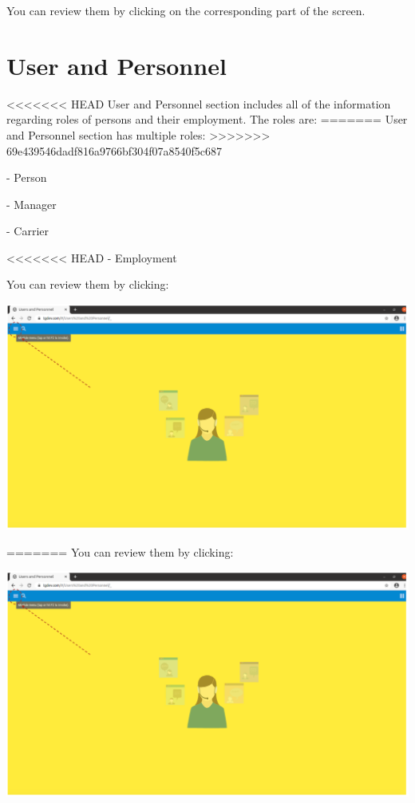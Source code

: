 You can review them by clicking on the corresponding part of the screen.

\section{User and Personnel}

<<<<<<< HEAD
User and Personnel section includes all of the information regarding roles of persons and their employment. The roles are:
=======
User and Personnel section has multiple roles: 
>>>>>>> 69e439546dadf816a9766bf304f07a8540f5c687

- Person 

- Manager

- Carrier

<<<<<<< HEAD
- Employment

You can review them by clicking:

\includegraphics[width=\textwidth]{sections/01-chapter/images/review1.png}



=======
You can review them by clicking:

\includegraphics[width=\textwidth]{sections/01-chapter/images/review1.png}



